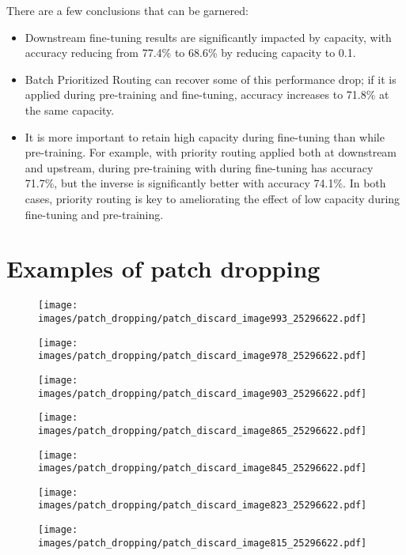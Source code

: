 \documentclass{article}
\newcommand{\maxrouting}{Batch Prioritized Routing}
\begin{document}
There are a few conclusions that can be garnered:
\begin{itemize}
    \item Downstream fine-tuning results are significantly impacted by capacity, with accuracy reducing from 77.4\% to 68.6\% by reducing capacity to 0.1.
    \item \maxrouting{} can recover some of this performance drop; if it is applied during pre-training and fine-tuning, accuracy increases to 71.8\% at the same capacity.
    \item It is more important to retain high capacity during fine-tuning than while pre-training. For example, with priority routing applied both at downstream and upstream,  during pre-training with  during fine-tuning has accuracy 71.7\%, but the inverse is significantly better with accuracy 74.1\%. In both cases, priority routing is key to ameliorating the effect of low capacity during fine-tuning and pre-training.
\end{itemize}
 \clearpage
\section{Examples of patch dropping}
\label{app_skip_patch_images}

\begin{figure}[h]
\centering
\texttt{[image: images/patch\_dropping/patch\_discard\_image993\_25296622.pdf]}

\centering
\texttt{[image: images/patch\_dropping/patch\_discard\_image978\_25296622.pdf]}

\centering
\texttt{[image: images/patch\_dropping/patch\_discard\_image903\_25296622.pdf]}

\centering
\texttt{[image: images/patch\_dropping/patch\_discard\_image865\_25296622.pdf]}

\centering
\texttt{[image: images/patch\_dropping/patch\_discard\_image845\_25296622.pdf]}

\centering
\texttt{[image: images/patch\_dropping/patch\_discard\_image823\_25296622.pdf]}

\centering
\texttt{[image: images/patch\_dropping/patch\_discard\_image815\_25296622.pdf]}

\end{figure}
\end{document}
